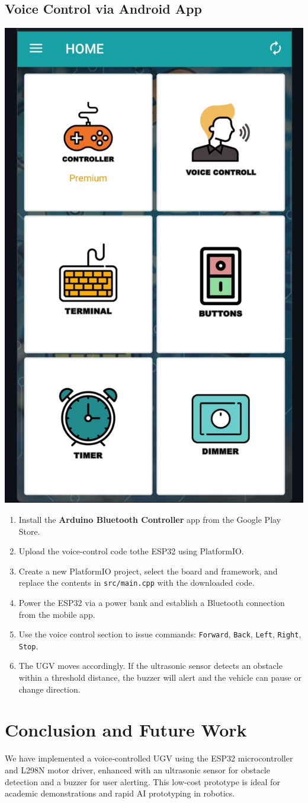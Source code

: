 \documentclass[conference]{IEEEtran}
\begin{document}
\subsection{Voice Control via Android App}
\includegraphics[width=0.4\linewidth]{Arduino_Bluetooth.jpg}
\begin{enumerate}
    \item Install the \textbf{Arduino Bluetooth Controller} app from the Google Play Store.
    \item Upload the voice‑control code tothe ESP32 using PlatformIO.
    \item Create a new PlatformIO project, select the board and framework, and replace the contents in \texttt{src/main.cpp} with the downloaded code.
    \item Power the ESP32 via a power bank and establish a Bluetooth connection from the mobile app.
    \item Use the voice control section to issue commands: \texttt{Forward}, \texttt{Back}, \texttt{Left}, \texttt{Right}, \texttt{Stop}.
    \item The UGV moves accordingly. If the ultrasonic sensor detects an obstacle within a threshold distance, the buzzer will alert and the vehicle can pause or change direction.
\end{enumerate}

\section{Conclusion and Future Work}
We have implemented a voice‑controlled UGV using the ESP32 microcontroller and L298N motor driver, enhanced with an ultrasonic sensor for obstacle detection and a buzzer for user alerting. This low‑cost prototype is ideal for academic demonstrations and rapid AI prototyping in robotics.
\end{document}
